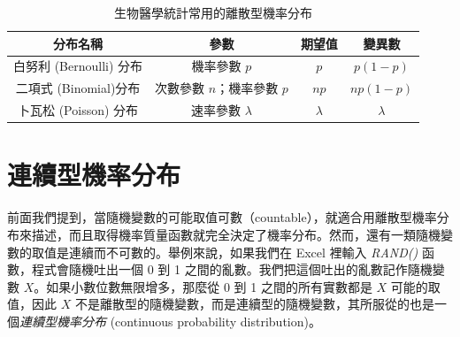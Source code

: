     \begin{table}[htbp]
        \begin{center}
            \begin{tabular}{cccc}
                \toprule
                分布名稱 & 參數 & 期望值 & 變異數\\
                \hline
                白努利 (Bernoulli) 分布 & 機率參數 $p$ & $p$ & $p(1-p)$\\
                二項式 (Binomial)分布 & 次數參數 $n$；機率參數 $p$ & $np$ & $np(1-p)$\\
                卜瓦松 (Poisson) 分布 & 速率參數 $\lambda$ & $\lambda$ & $\lambda$\\
                \bottomrule
            \end{tabular}
            \caption{生物醫學統計常用的離散型機率分布\label{tab:discrete_distribution}}
        \end{center}
    \end{table}
    
\section{連續型機率分布}

    前面我們提到，當隨機變數的可能取值可數（countable），就適合用離散型機率分布來描述，而且取得機率質量函數就完全決定了機率分布。然而，還有一類隨機變數的取值是連續而不可數的。舉例來說，如果我們在 Excel 裡輸入 \textit{RAND()} 函數，程式會隨機吐出一個 0 到 1 之間的亂數。我們把這個吐出的亂數記作隨機變數 $X$。如果小數位數無限增多，那麼從 0 到 1 之間的所有實數都是 $X$ 可能的取值，因此 $X$ 不是離散型的隨機變數，而是連續型的隨機變數，其所服從的也是一個\textit{連續型機率分布} (continuous probability distribution)。

